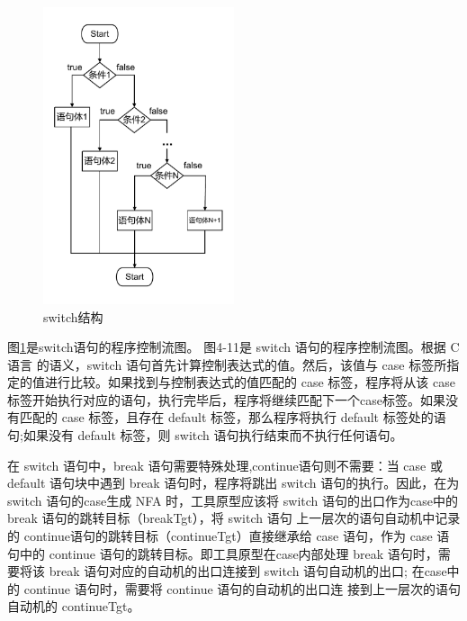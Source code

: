 \begin{figure}[htbp]
	\centering
	\includegraphics[width=0.5\textwidth]{pictures/switch结构.pdf}
	\caption{switch结构}
	\label{fig:switch结构}
\end{figure}

图\ref{fig:switch结构}是switch语句的程序控制流图。
图4-11是 switch 语句的程序控制流图。根据 C语言 的语义，switch 语句首先计算控制表达式的值。然后，该值与 case 标签所指定的值进行比较。如果找到与控制表达式的值匹配的 case 标签，程序将从该 case 标签开始执行对应的语句，执行完毕后，程序将继续匹配下一个case标签。如果没有匹配的 case 标签，且存在 default 标签，那么程序将执行 default 标签处的语句;如果没有 default 标签，则 switch 语句执行结束而不执行任何语句。

在 switch 语句中，break 语句需要特殊处理,continue语句则不需要：当 case 或 default 语句块中遇到 break 语句时，程序将跳出 switch 语句的执行。因此，在为 switch 语句的case生成 NFA 时，工具原型应该将 switch 语句的出口作为case中的 break 语句的跳转目标（breakTgt），将 switch 语句
上一层次的语句自动机中记录的 continue语句的跳转目标（continueTgt）直接继承给 case 语句，作为 case 语句中的 continue 语句的跳转目标。即工具原型在case内部处理 break 语句时，需要将该 break 语句对应的自动机的出口连接到 switch 语句自动机的出口;
在case中的 continue 语句时，需要将 continue 语句的自动机的出口连
接到上一层次的语句自动机的 continueTgt。

